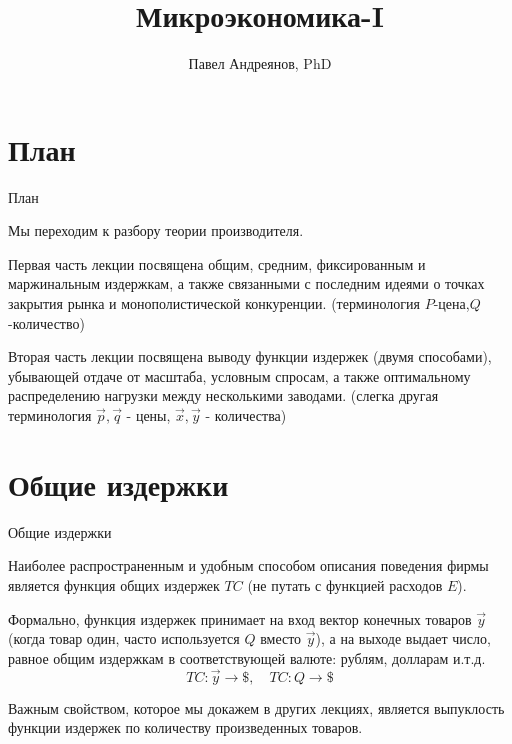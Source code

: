 \documentclass{beamer}
\title{
Микроэкономика-I
}
\author{
Павел Андреянов, PhD
}
\begin{document}
\maketitle

\section{План}

\begin{frame}{План}
	
Мы переходим к разбору теории производителя.

\alert{Первая часть лекции} посвящена общим, средним, фиксированным и маржинальным  издержкам, а также связанными с последним идеями о точках закрытия рынка и монополистической конкуренции. (терминология $P$-цена,$Q$-количество)

\alert{Вторая часть лекции} посвящена выводу функции издержек (двумя способами), убывающей отдаче от масштаба, условным спросам, а также оптимальному распределению нагрузки между несколькими заводами. (слегка другая терминология $\vec p, \vec q$ - цены, $\vec x, \vec y$ - количества)

	
\end{frame}

\section{Общие издержки}

\begin{frame}{Общие издержки}

Наиболее распространенным и удобным способом описания поведения фирмы является функция общих издержек $TC$ (не путать с функцией расходов $E$).

Формально, функция издержек принимает на вход вектор конечных товаров $\vec y$ (когда товар один, часто используется $Q$ вместо $\vec y$), а на выходе выдает число, равное общим издержкам в соответствующей валюте: рублям, долларам и.т.д.
$$ TC: \vec y \to \$, \quad TC: Q \to \$ $$

Важным свойством, которое мы докажем в других лекциях, является \alert{выпуклость функции издержек по количеству произведенных товаров}.

\end{frame}
\end{document}
